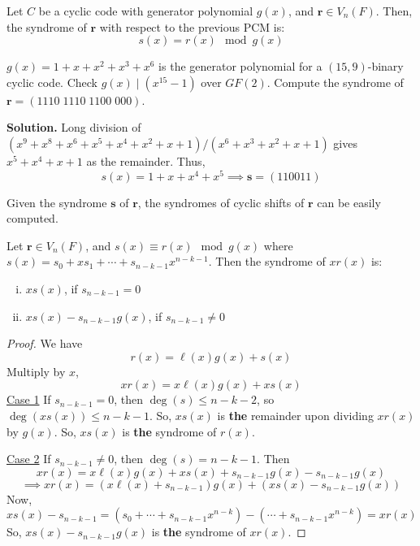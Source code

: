 \begin{thmbox}
    \begin{theorem}
        Let $ C $ be a cyclic code with generator polynomial $ g(x) $, and $ \bm{r}\in V_n(F) $.
        Then, the syndrome of $ \bm{r} $ with respect to the previous PCM is:
        \[ s(x)=r(x)\mod g(x) \]
    \end{theorem}
\end{thmbox}

\begin{exbox}
    \begin{example}
        $ g(x)=1+x+x^2+x^3+x^6 $ is the generator polynomial for a $ (15,9) $-binary cyclic code.
        Check $ g(x)\mid (x^{15}-1) $ over $ GF(2) $. Compute the syndrome of
        $ \bm{r}=(1110\; 1110\; 1100\; 000) $.

        \textbf{Solution.} Long division of $ (x^9+x^8+x^6+x^5+x^4+x^2+x+1)/(x^6+x^3+x^2+x+1) $
        gives $ x^5+x^4+x+1 $ as the remainder. Thus,
        \[ s(x)=1+x+x^4+x^5\implies \bm{s}=(110011) \]
    \end{example}
\end{exbox}

\begin{remark}
    Given the syndrome $ \bm{s} $ of $ \bm{r} $, the syndromes of cyclic shifts of $ \bm{r} $
    can be easily computed.
\end{remark}

\begin{thmbox}
    \begin{theorem}\label{syndrome calculation}
        Let $ \bm{r}\in V_n(F) $, and $ s(x) \equiv r(x)\mod g(x) $ where
        $ s(x) = s_0+xs_1+\cdots+s_{n-k-1}x^{n-k-1} $.
        Then the syndrome of $ xr(x) $ is:
        \begin{enumerate}[(i)]
            \item $ xs(x) $, if $ s_{n-k-1}=0 $
            \item $ xs(x)-s_{n-k-1}g(x) $, if $ s_{n-k-1}\neq 0 $
        \end{enumerate}
    \end{theorem}
\end{thmbox}

\begin{proof}
    We have
    \[ r(x)=\ell (x)g(x)+s(x) \]
    Multiply by $ x $,
    \[ xr(x)=x\ell(x)g(x)+xs(x) \]
    \underline{Case 1} If $ s_{n-k-1}=0 $, then $ \deg(s)\leqslant n-k-2 $,
    so $ \deg(xs(x))\leqslant n-k-1 $. So, $ xs(x) $ is \textbf{the} remainder upon dividing
    $ xr(x) $ by $ g(x) $. So, $ xs(x) $ is \textbf{the} syndrome of $ r(x) $.

    \underline{Case 2} If $ s_{n-k-1}\neq 0 $, then $ \deg(s)=n-k-1 $. Then
    \[ xr(x)=x\ell(x)g(x)+xs(x)+s_{n-k-1}g(x)-s_{n-k-1}g(x) \]
    \[ \implies xr(x)=(x\ell(x)+s_{n-k-1})g(x)+(xs(x)-s_{n-k-1}g(x)) \]
    Now,
    \[ xs(x)-s_{n-k-1}=(s_0+\cdots+s_{n-k-1}x^{n-k})-(\cdots+s_{n-k-1}x^{n-k})=xr(x) \]
    So, $ xs(x)-s_{n-k-1}g(x) $ is \textbf{the} syndrome of $ xr(x) $.
\end{proof}
